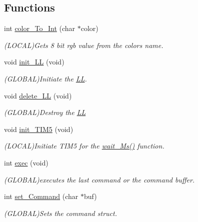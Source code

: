 \subsection*{Functions}
\begin{DoxyCompactItemize}
\item 
int \mbox{\hyperlink{namespace_l_l_af61e12d8feebbbdb330c2405c305840b}{color\+\_\+\+To\+\_\+\+Int}} (char $\ast$color)
\begin{DoxyCompactList}\small\item\em (L\+O\+C\+AL)Gets 8 bit rgb value from the colors name. \end{DoxyCompactList}\item 
void \mbox{\hyperlink{namespace_l_l_a201bbec5c7219ca80c90d31b0a31b482}{init\+\_\+\+LL}} (void)
\begin{DoxyCompactList}\small\item\em (G\+L\+O\+B\+AL)Initiate the \mbox{\hyperlink{namespace_l_l}{LL}}. \end{DoxyCompactList}\item 
void \mbox{\hyperlink{namespace_l_l_a78899c6737310be03f8a2f05f9d7e09e}{delete\+\_\+\+LL}} (void)
\begin{DoxyCompactList}\small\item\em (G\+L\+O\+B\+AL)Destroy the \mbox{\hyperlink{namespace_l_l}{LL}} \end{DoxyCompactList}\item 
void \mbox{\hyperlink{namespace_l_l_a559eb54e37dc62032e9774315c2b4638}{init\+\_\+\+T\+I\+M5}} (void)
\begin{DoxyCompactList}\small\item\em (L\+O\+C\+AL)Initiate T\+I\+M5 for the \mbox{\hyperlink{namespace_l_l_ab30bdedb41438098df71bea7d5eb624d}{wait\+\_\+\+Ms()}} function. \end{DoxyCompactList}\item 
int \mbox{\hyperlink{namespace_l_l_ac98bc19f4e3468b76cfc2e43456527cc}{exec}} (void)
\begin{DoxyCompactList}\small\item\em (G\+L\+O\+B\+AL)executes the last command or the command buffer. \end{DoxyCompactList}\item 
int \mbox{\hyperlink{namespace_l_l_a487e020844f801061abc930461b1ff2b}{set\+\_\+\+Command}} (char $\ast$buf)
\begin{DoxyCompactList}\small\item\em (G\+L\+O\+B\+AL)Sets the command struct. \end{DoxyCompactList}\item 

\end{DoxyCompactItemize}
